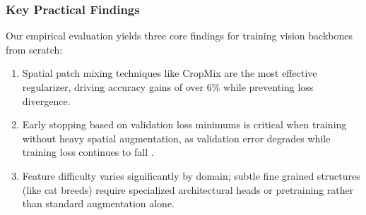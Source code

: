 \subsubsection{Key Practical Findings}
Our empirical evaluation yields three core findings for training vision backbones from scratch:
\begin{enumerate}
    \item Spatial patch mixing techniques like CropMix are the most effective regularizer, driving accuracy gains of over $6\%$ while preventing loss divergence.
    \item Early stopping based on validation loss minimums is critical when training without heavy spatial augmentation, as validation error degrades while training loss continues to fall \cite{prechelt1998early}.
    \item Feature difficulty varies significantly by domain; subtle fine grained structures (like cat breeds) require specialized architectural heads or pretraining rather than standard augmentation alone.
\end{enumerate}